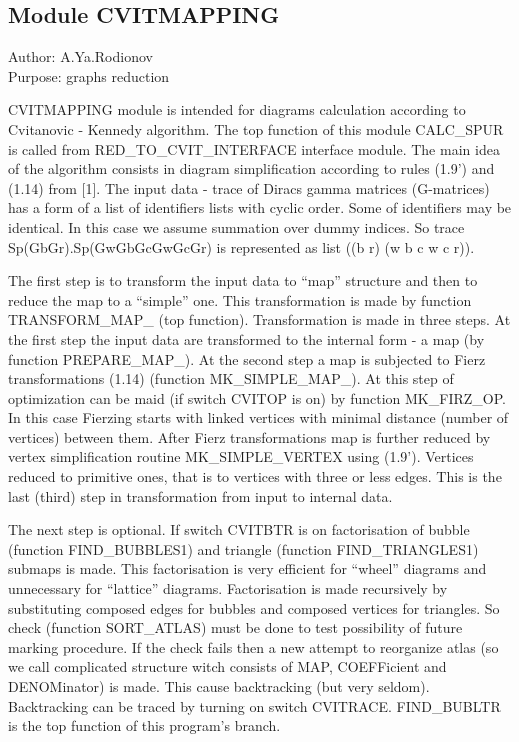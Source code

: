 \subsection*{Module CVITMAPPING}

\begin{center}
Author: A.Ya.Rodionov \\
Purpose: graphs reduction
\end{center}

CVITMAPPING module is intended for diagrams calculation according to
Cvitanovic - Kennedy algorithm. The top function of this module
CALC\_SPUR is called from RED\_TO\_CVIT\_INTERFACE interface module.
The main idea of the algorithm consists in diagram simplification
according to rules (1.9') and (1.14) from [1].  The input data - trace
of Diracs gamma matrices (G-matrices) has a form of a list of
identifiers lists with cyclic order. Some of identifiers may be
identical.  In this case we assume summation over dummy indices. So
trace Sp(GbGr).Sp(GwGbGcGwGcGr) is represented as list ((b r) (w b c w
c r)).

The first step is to transform the input data to ``map'' structure and
then to reduce the map to a ``simple'' one. This transformation is made
by function TRANSFORM\_MAP\_ (top function). Transformation is made in
three steps. At the first step the input data are transformed to the
internal form - a map (by function PREPARE\_MAP\_). At the second step
a map is subjected to Fierz transformations (1.14) (function
MK\_SIMPLE\_MAP\_). At this step of optimization can be maid (if
switch CVITOP is on) by function MK\_FIRZ\_OP.  In this case Fierzing
starts with linked vertices with minimal distance (number of vertices)
between them.  After Fierz transformations map is further reduced by
vertex simplification routine MK\_SIMPLE\_VERTEX using (1.9').
Vertices reduced to primitive ones, that is to vertices with three or
less edges.  This is the last (third) step in transformation from
input to internal data.

The next step is optional.  If switch CVITBTR is on factorisation of
bubble (function FIND\_BUBBLES1) and triangle (function
FIND\_TRIANGLES1) submaps is made.  This factorisation is very
efficient for ``wheel'' diagrams and unnecessary for ``lattice'' diagrams.
Factorisation is made recursively by substituting composed edges for
bubbles and composed vertices for triangles.  So check (function
SORT\_ATLAS) must be done to test possibility of future marking
procedure.  If the check fails then a new attempt to reorganize atlas
(so we call complicated structure witch consists of MAP, COEFFicient
and DENOMinator) is made. This cause backtracking (but very seldom).
Backtracking can be traced by turning on switch CVITRACE. FIND\_BUBLTR
is the top function of this program's branch.

